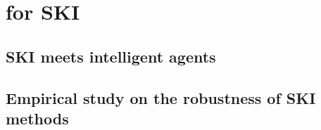 \section[Quality of service for SKI]{ for \Gls{SKI}}\label{sec:qos}

\subsection[SKI meets intelligent agents]{\Gls{SKI} meets intelligent agents}\label{subsec:ski-meets-intelligent-agents}
%

\subsection[Empirical study on the robustness of SKI methods]{Empirical study on the robustness of \Gls{SKI} methods}\label{subsec:empirical-study-on-the-robustness-of-ski-methods}
%
